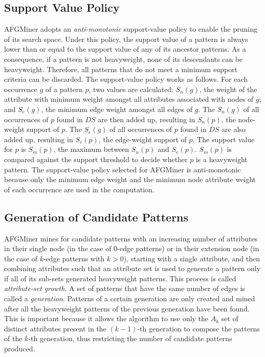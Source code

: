 \subsection{Support Value Policy}
AFGMiner adopts an \emph{anti-monotonic} support-value policy to enable the pruning of its search space. Under this policy, the support value of a pattern is always lower than or equal to the support value of any of its ancestor patterns. As a consequence, if a pattern is not heavyweight, none of its descendants can be heavyweight. Therefore, all patterns that do not meet a minimum support criteria can be discarded. The support-value policy works as follows. For each occurrence $g$ of a pattern $p$, two values are calculated: $S_n(g)$, the weight of the attribute with minimum weight amongst all attributes associated with nodes of $g$; and $S_e(g)$, the minimum edge weight amongst all edges of $g$. The $S_n(g)$ of all occurrences of $p$ found in $DS$ are then added up, resulting in $S_n(p)$, the node-weight support of $p$. The $S_e(g)$ of all occurrences of $p$ found in $DS$ are also added up, resulting in $S_e(p)$, the edge-weight support of $p$. The support value for $p$ is $S_m(p)$, the maximum between $S_n(p)$ and $S_e(p)$. $S_m(p)$ is compared against the support threshold to decide whether $p$ is a heavyweight pattern. The support-value policy selected for AFGMiner is anti-monotonic because only the minimum edge weight and the minimum node attribute weight of each occurrence are used in the computation.

\subsection{Generation of Candidate Patterns}
AFGMiner mines for candidate patterns with an increasing number of attributes in their single node (in the case of 0-edge patterns) or in their extension node (in the case of $k$-edge patterns with $k > 0$), starting with a single attribute, and then combining attributes such that an attribute set is used to generate a pattern only if all of its sub-sets generated heavyweight patterns. This process is called \emph{attribute-set growth}. A set of patterns that have the same number of edges is called a \emph{generation}. Patterns of a certain generation are only created and mined after all the heavyweight patterns of the previous generation have been found. This is important because it allows the algorithm to use only the $A_k$ set of distinct attributes present in the $(k - 1)$-th generation to compose the patterns of the $k$-th generation, thus restricting the number of candidate patterns produced.

